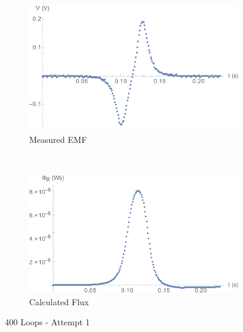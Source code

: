 \documentclass[a4paper]{scrartcl}
\begin{document}
\begin{figure}[p]
    \centering
    \begin{subfigure}[b]{0.45\textwidth}
        \includegraphics[width = \textwidth]{400_1_voltage.png}
        \caption{Measured EMF}
    \end{subfigure}
    ~
    \begin{subfigure}[b]{0.45\textwidth}
        \includegraphics[width = \textwidth]{400_1_flux.png}
        \caption{Calculated Flux}
    \end{subfigure}
    \caption{400 Loops - Attempt 1}
    \label{fig:400_1}
\end{figure}
\end{document}

